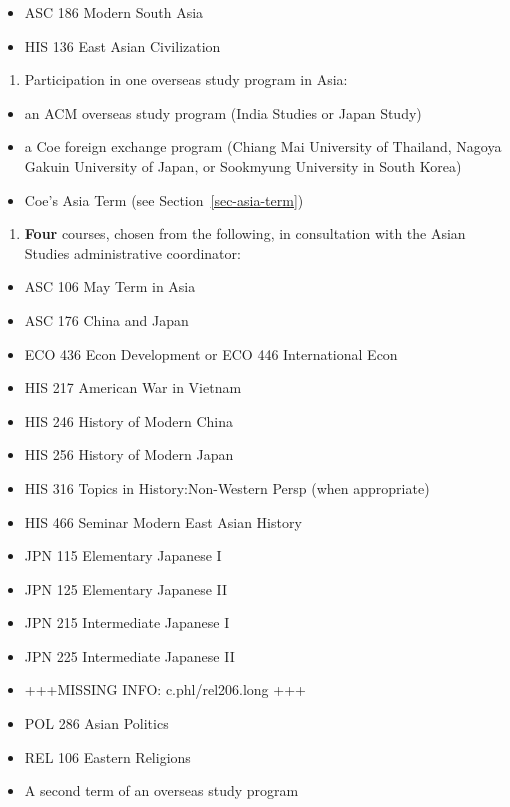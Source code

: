 \documentclass[
  letterpaper,
]{scrbook}
\providecommand{\tightlist}{%
  \setlength{\itemsep}{0pt}\setlength{\parskip}{0pt}}
\begin{document}
\begin{itemize}
\tightlist
\item
  ASC 186 Modern South Asia
\item
  HIS 136 East Asian Civilization
\end{itemize}

\begin{enumerate}
\def\labelenumi{\arabic{enumi}.}
\setcounter{enumi}{1}
\tightlist
\item
  Participation in one overseas study program in Asia:
\end{enumerate}

\begin{itemize}
\tightlist
\item
  an ACM overseas study program (India Studies or Japan Study)
\item
  a Coe foreign exchange program (Chiang Mai University of Thailand,
  Nagoya Gakuin University of Japan, or Sookmyung University in South
  Korea)
\item
  Coe's Asia Term (see Section~\ref{sec-asia-term})
\end{itemize}

\begin{enumerate}
\def\labelenumi{\arabic{enumi}.}
\setcounter{enumi}{2}
\tightlist
\item
  \textbf{Four} courses, chosen from the following, in consultation with
  the Asian Studies administrative coordinator:
\end{enumerate}

\begin{itemize}
\tightlist
\item
  ASC 106 May Term in Asia
\item
  ASC 176 China and Japan
\item
  ECO 436 Econ Development or ECO 446 International Econ
\item
  HIS 217 American War in Vietnam
\item
  HIS 246 History of Modern China
\item
  HIS 256 History of Modern Japan
\item
  HIS 316 Topics in History:Non-Western Persp (when appropriate)
\item
  HIS 466 Seminar Modern East Asian History
\item
  JPN 115 Elementary Japanese I
\item
  JPN 125 Elementary Japanese II
\item
  JPN 215 Intermediate Japanese I
\item
  JPN 225 Intermediate Japanese II
\item
  +++MISSING INFO: c.phl/rel206.long +++
\item
  POL 286 Asian Politics
\item
  REL 106 Eastern Religions
\item
  A second term of an overseas study program
\end{itemize}
\end{document}
